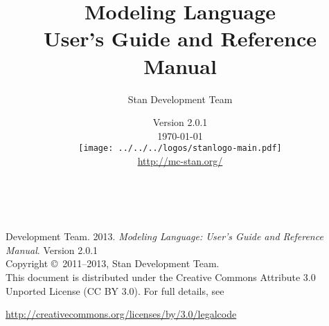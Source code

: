 \title{\Huge\bf \Stan Modeling Language \\[4pt] {\LARGE User's Guide
    and Reference Manual}}
\author{Stan Development Team}

\date{\vspace*{36pt} \Stan Version
2.0.1
\\[8pt] {\small \today}
\\[36pt]
{
\vfill
\texttt{[image: ../../../logos/stanlogo-main.pdf]}}
\\
\vspace*{6pt}
{\small \url{http://mc-stan.org/}}
}
\maketitle

\newpage
\thispagestyle{empty}
\mbox{ }
\vfill
\begin{center}
\begin{minipage}[t]{0.75\textwidth}
\small
\Stan Development Team. 2013.  
{\it \Stan Modeling Language: User's Guide and Reference Manual}. Version
2.0.1
\vspace*{20pt}
\mbox{ }
\\
Copyright \copyright \ 2011--2013, Stan Development Team.
\vspace*{28pt}
\mbox{} \\
This document is distributed under the Creative Commons Attribute 3.0
Unported License (CC BY 3.0).  For full details, see
\begin{center}
\url{http://creativecommons.org/licenses/by/3.0/legalcode} 
\end{center}
\end{minipage}
\vspace*{24pt}
\mbox{ }
\end{center}
